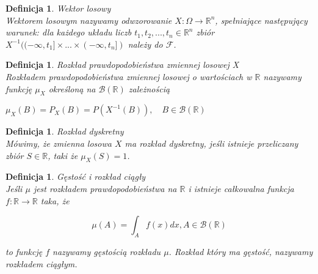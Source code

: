 \documentclass[12pt,a4paper]{report}
\newtheorem{definition}[theorem]{Definicja}
\begin{document}
\begin{definition}{Wektor losowy \cite[Rozdział 5.1]{jakubowski2004}\\}
Wektorem losowym nazywamy odwzorowanie $X:\Omega \rightarrow \mathbb{R}^n$, spełniające następujący warunek: dla każdego układu liczb $t_1,t_2,...,t_n \in \mathbb{R}^n$ zbiór $X^{-1}((-\infty,t_1]\times...\times(-\infty,t_n])$ należy do $\mathcal{F}$.\\
\end{definition}

\begin{definition}{Rozkład prawdopodobieństwa zmiennej losowej X \cite[Rozdział 5.1]{jakubowski2004}\\}
Rozkładem prawdopodobieństwa zmiennej losowej o wartościach w $\mathbb{R}$ nazywamy funkcję $\mu_X$ określoną na $\mathcal{B}(\mathbb{R})$ zależnością
\begin{center}
$\mu_X(B)=P_X(B)=P(X^{-1}(B)), \quad B \in \mathcal{B}(\mathbb{R})$\\
\end{center} 
\end{definition}

\begin{definition}{Rozkład dyskretny \cite[Rozdział 5.1]{jakubowski2004}\\}
Mówimy, że zmienna losowa $X$ ma rozkład dyskretny, jeśli istnieje przeliczany zbiór $S \in \mathbb{R}$, taki że $\mu_X(S)=1$.\\
\end{definition}

\begin{definition}{Gęstość i rozkład ciągły \cite[Rozdział 5.1]{jakubowski2004}\\}
Jeśli $\mu$ jest rozkładem prawdopodobieństwa na $\mathbb{R}$ i istnieje całkowalna funkcja $f: \mathbb{R} \rightarrow \mathbb{R}$ taka, że 
\begin{center}
$$\mu(A)=\int_A f(x)dx,   A\in \mathcal{B}(\mathbb{R})  $$  %
\end{center}
to funkcję $f$ nazywamy gęstością rozkładu $\mu$. Rozkład który ma gęstość, nazywamy rozkładem ciągłym. \\
\end{definition}

\end{document}
